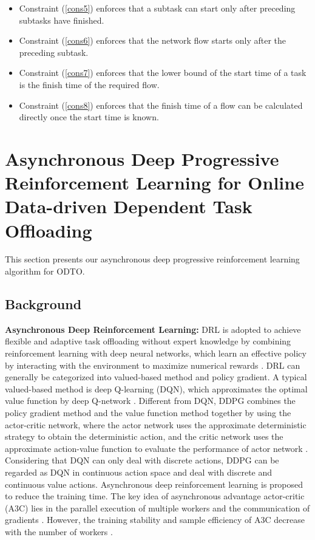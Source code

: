 \documentclass[10pt, conference, letterpaper]{IEEEtran}
\begin{document}
\begin{itemize}

\item Constraint (\ref{cons5}) enforces that a subtask can start only after preceding subtasks have finished.

\item Constraint (\ref{cons6}) enforces that the network flow starts only after the preceding subtask.

\item Constraint (\ref{cons7}) enforces that the lower bound of the start time of a task is the finish time of the required flow. 

\item Constraint (\ref{cons8}) enforces that the finish time of a flow can be calculated directly once the start time is known.

\end{itemize}

\section{Asynchronous Deep Progressive Reinforcement Learning for Online Data-driven Dependent Task Offloading}\label{sec:proposed-method}

This section presents our asynchronous deep progressive reinforcement learning algorithm for ODTO.

\subsection{Background}
\textbf{Asynchronous Deep Reinforcement Learning:} DRL is adopted to achieve flexible and adaptive task offloading without expert knowledge by combining reinforcement learning with deep neural networks, which learn an effective policy by interacting with the environment to maximize numerical rewards \cite{wang2021dependent}. DRL can generally be categorized into valued-based method and policy gradient. A typical valued-based method is deep Q-learning (DQN), which approximates the optimal value function by deep Q-network \cite{mnih2015human}. Different from DQN, DDPG combines the policy gradient method and the value function method together by using the actor-critic network, where the actor network uses the approximate deterministic strategy to obtain the deterministic action, and the critic network uses the approximate action-value function to evaluate the performance of actor network \cite{lillicrap2015continuous}. Considering that DQN can only deal with discrete actions, DDPG can be regarded as DQN in continuous action space and deal with discrete and continuous value actions. Asynchronous deep reinforcement learning is proposed to reduce the training time. The key idea of asynchronous advantage actor-critic (A3C) lies in the parallel execution of multiple workers and the communication of gradients \cite{mnih2016asynchronous}. However, the training stability and sample efficiency of A3C decrease with the number of workers \cite{zhang2019asynchronous}.
\end{document}
